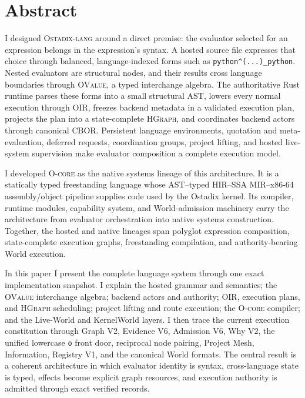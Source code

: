 \documentclass[11pt,oneside]{article}
\newcommand{\product}{\textsc{Ostadix-lang}}
\newcommand{\ovalue}{\textsc{OValue}}
\newcommand{\oir}{\textsc{OIR}}
\newcommand{\hgraph}{\textsc{HGraph}}
\newcommand{\ocore}{\textsc{O-core}}
\begin{document}
\color{OInk}
\hypersetup{pageanchor=true}

\section*{Abstract}

I designed \product{} around a direct premise: the evaluator selected for an
expression belongs in the expression's syntax. A hosted source file expresses
that choice through balanced, language-indexed forms such as
\texttt{python\string^(...\string)\_python}. Nested evaluators are structural
nodes, and their results cross language boundaries through \ovalue{}, a typed
interchange algebra. The
authoritative Rust runtime parses these forms into a small structural AST,
lowers every normal execution through \oir{}, freezes backend metadata in a
validated execution plan, projects the plan into a state-complete \hgraph{},
and coordinates backend actors through canonical CBOR. Persistent language
environments, quotation and meta-evaluation, deferred requests, coordination
groups, project lifting, and hosted live-system supervision make evaluator
composition a complete execution model.

I developed \ocore{} as the native systems lineage of this architecture. It is
a statically typed freestanding language whose AST--typed HIR--SSA
MIR--x86-64 assembly/object pipeline supplies code used by the Ostadix kernel.
Its compiler, runtime modules, capability system, and World-admission machinery
carry the architecture from evaluator orchestration into native systems
construction. Together, the hosted and native lineages span polyglot
expression composition, state-complete execution graphs, freestanding
compilation, and authority-bearing World execution.

In this paper I present the complete language system through one exact
implementation snapshot. I explain the hosted grammar and semantics; the
\ovalue{} interchange algebra;
backend actors and authority; \oir{}, execution plans, and \hgraph{}
scheduling; project lifting and route execution; the \ocore{} compiler; and
the Live-World and KernelWorld layers. I then trace the current execution
constitution through Graph V2, Evidence V6, Admission V6, Why V2, the unified
lowercase \texttt{o} front door, reciprocal node pairing, Project Mesh,
Information, Registry V1, and the canonical World formats. The central result
is a coherent architecture in which evaluator identity is syntax,
cross-language state is typed, effects become explicit graph resources, and
execution authority is admitted through exact verified records.
\end{document}
